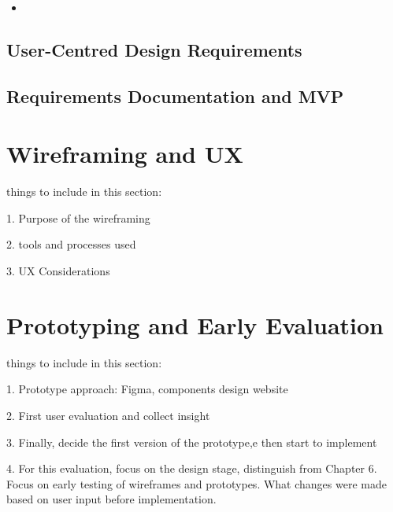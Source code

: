 \begin{itemize}
    \item 
\end{itemize}

\subsection{User-Centred Design Requirements}

\subsection{Requirements Documentation and MVP}

\section{Wireframing and UX}
things to include in this section:

1. Purpose of the wireframing

2. tools and processes used

3. UX Considerations
\section{Prototyping and Early Evaluation}
things to include in this section:

1. Prototype approach: Figma, components design website

2. First user evaluation and collect insight

3. Finally, decide the first version of the prototype,e then start to implement

4. For this evaluation, focus on the design stage, distinguish from Chapter 6. Focus on early testing of wireframes and prototypes. What changes were made based on user input before implementation.